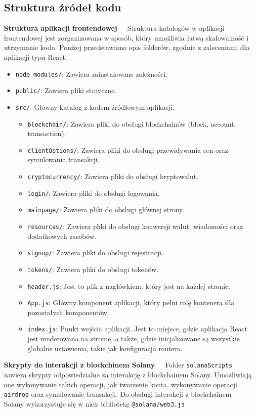 \subsection{Struktura źródeł kodu}
\noindent \textbf{Struktura aplikacji frontendowej~~}
Struktura katalogów w aplikacji frontendowej jest zorganizowana w sposób, który umożliwia łatwą skalowalność i utrzymanie kodu. Poniżej przedstawiono opis folderów, zgodnie z zaleceniami dla aplikacji typu React.
\begin{itemize}
    \item \texttt{node\_modules/}: Zawiera zainstalowane zależności.
    \item \texttt{public/}: Zawiera pliki statyczne.
    \item \texttt{src/}: Główny katalog z kodem źródłowym aplikacji.
    \begin{itemize}
        \item \texttt{blockchain/}: Zawiera pliki do obsługi blockchainów (block, account, transaction).
        \item \texttt{clientOptions/}: Zawiera pliki do obsługi przewidywania cen oraz symulowania transakcji.
        \item \texttt{cryptocurrency/}: Zawiera pliki do obsługi kryptowalut.
        \item \texttt{login/}: Zawiera pliki do obsługi logowania.
        \item \texttt{mainpage/}: Zawiera pliki do obsługi głównej strony.
        \item \texttt{resources/}: Zawiera pliki do obsługi konwersji walut, wiadomości oraz dodatkowych zasobów.
        \item \texttt{signup/}: Zawiera pliki do obsługi rejestracji.
        \item \texttt{tokens/}: Zawiera pliki do obsługi tokenów.
        \item \texttt{header.js}: Jest to plik z nagłówkiem, który jest na każdej stronie.
        \item \texttt{App.js}: Główny komponent aplikacji, który pełni rolę kontenera dla pozostałych komponentów.
        \item \texttt{index.js}: Punkt wejścia aplikacji. Jest to miejsce, gdzie aplikacja React jest renderowana na stronie, a także, gdzie inicjalizowane są wszystkie globalne ustawienia, takie jak konfiguracja routera.
    \end{itemize}
\end{itemize}

\noindent \textbf{Skrypty do interakcji z blockchinem Solany~~}
Folder \texttt{solanaScripts} zawiera skrypty odpowiedzialne za interakcję z blockchainem Solany. Umożliwiają one wykonywanie takich operacji, jak tworzenie konta, wykonywanie operacji \texttt{airdrop} oraz symulowanie transakcji. Do obsługi interakcji z blockchainem Solany wykorzystuje się w nich bibliotekę \texttt{@solana/web3.js}

